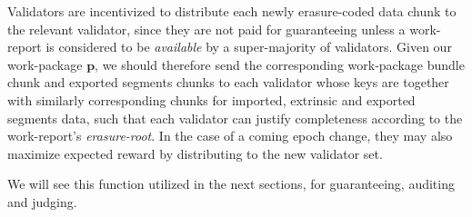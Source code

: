 Validators are incentivized to distribute each newly erasure-coded data chunk to the relevant validator, since they are not paid for guaranteeing unless a work-report is considered to be \emph{available} by a super-majority of validators. Given our work-package $\mathbf{p}$, we should therefore send the corresponding work-package bundle chunk and exported segments chunks to each validator whose keys are together with similarly corresponding chunks for imported, extrinsic and exported segments data, such that each validator can justify completeness according to the work-report's \emph{erasure-root}. In the case of a coming epoch change, they may also maximize expected reward by distributing to the new validator set.

We will see this function utilized in the next sections, for guaranteeing, auditing and judging.

\undef{\newavailabilityspecifier}
\undef{\itemtodigest}
\undef{\countupexports}
\undef{\importsegmentdata}
\undef{\pagedproofs}
\undef{\marshallrefine}
\undef{\extrinsicdata}
\undef{\segsX}
